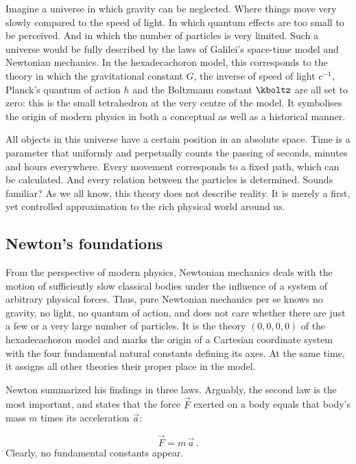 
\newpage {}
\label{sec:0000}

Imagine a universe in which gravity can be neglected. Where things move very slowly compared to the speed of light. In which quantum effects are too small to be perceived. And in which the number of particles is very limited. Such a universe would be fully described by the laws of Galilei's space-time model and Newtonian mechanics. In the hexadecachoron model, this corresponds to the theory in which the gravitational constant $G$, the inverse of speed of light $c^{-1}$, Planck's quantum of action $h$ and the Boltzmann constant $\kboltz$ are all set to zero: this is the small tetrahedron at the very centre of the model. It symbolises the origin of modern physics in both a conceptual as well as a historical manner.

All objects in this universe have a certain position in an absolute space. Time is a parameter that uniformly and perpetually counts the passing of seconds, minutes and hours everywhere. Every movement corresponds to a fixed path, which can be calculated. And every relation between the particles is determined. Sounds familiar? As we all know, this theory does not describe reality. It is merely a first, yet controlled approximation to the rich physical world around us.


\subsection*{Newton's foundations}

From the perspective of modern physics, Newtonian mechanics deals with the motion of sufficiently slow classical bodies under the influence of a system of arbitrary physical forces. Thus, pure Newtonian mechanics per se knows no gravity, no light, no quantum of action, and does not care whether there are just a few or a very large number of particles. It is the theory $(0,0,0,0)$ of the hexadecachoron model and marks the origin of a Cartesian coordinate system with the four fundamental natural constants defining its axes. At the same time, it assigns all other theories their proper place in the model.

Newton summarized his findings in three laws. Arguably, the second law is the most important, and states that the force $\vec{F}$ exerted on a body equals that body's mass $m$ times its acceleration $\vec{a}$:

\begin{equation*}
  \vec{F} =m\, \vec{a}\,.
\end{equation*}
%
Clearly, no fundamental constants appear.


